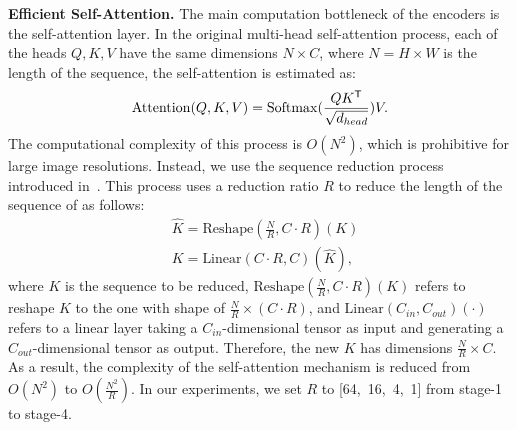 \textbf{Efficient Self-Attention.} 
The main computation bottleneck of the encoders is the self-attention layer. In the original multi-head self-attention process, each of the heads $Q, K, V$ have the same dimensions $N \times C$, where $N=H \times W$ is the length of the sequence, the self-attention is estimated as:
\begin{equation}
    {\rm Attention}({Q}, {K}, {V}) = {\rm Softmax}(\frac{{Q}{K}^\mathsf{T}}{\sqrt{d_{head}}}){V}.
    \label{eqn:mhsa}
\end{equation}
The computational complexity of this process is $O(N^2)$, which is prohibitive for large image resolutions. 
Instead, we use the sequence reduction process introduced in~\cite{pvt}. This process uses a reduction ratio $R$ to reduce the length of the sequence of as follows:
\begin{equation}
    \begin{aligned}
    &{\hat{K}} = {\text{Reshape}(\frac{N}{R},C \cdot R)(K)}\\
    &{K} = {\text{Linear}(C \cdot R, C)({\hat{K}}),}
    \end{aligned}
    \label{eqn:reduce}
\end{equation}
where $K$ is the sequence to be reduced, $\text{Reshape}(\frac{N}{R},C \cdot R)(K)$ refers to reshape $K$ to the one with shape of $\frac{N}{R}\times (C \cdot R)$,
%
and $\text{Linear}(C_{in}, C_{out})( \cdot)$ refers to a linear layer taking a $C_{in}$-dimensional tensor as input and generating a $C_{out}$-dimensional tensor as output. Therefore, the new $K$ has dimensions $\frac{N}{R} \times C$. As a result, the complexity of the self-attention mechanism is reduced from $O(N^2)$ to $O(\frac{N^2}{R})$. In our experiments, we set $R$ to [64,~16,~4,~1] from stage-1 to stage-4. 


